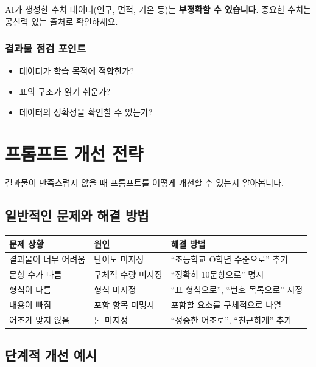 \documentclass[11pt,a4paper]{article}
\begin{document}
\begin{warningbox}
AI가 생성한 수치 데이터(인구, 면적, 기온 등)는 \textbf{부정확할 수 있습니다}. 중요한 수치는 공신력 있는 출처로 확인하세요.
\end{warningbox}

\subsubsection{결과물 점검 포인트}

\begin{itemize}
  \item 데이터가 학습 목적에 적합한가?
  \item 표의 구조가 읽기 쉬운가?
  \item 데이터의 정확성을 확인할 수 있는가?
\end{itemize}

\newpage

\section{프롬프트 개선 전략}

결과물이 만족스럽지 않을 때 프롬프트를 어떻게 개선할 수 있는지 알아봅니다.

\subsection{일반적인 문제와 해결 방법}

\begin{center}
\begin{tabular}{|l|l|l|}
\hline
\rowcolor{lightblue}
\textbf{문제 상황} & \textbf{원인} & \textbf{해결 방법} \\
\hline
결과물이 너무 어려움 & 난이도 미지정 & ``초등학교 O학년 수준으로'' 추가 \\
\hline
문항 수가 다름 & 구체적 수량 미지정 & ``정확히 10문항으로'' 명시 \\
\hline
형식이 다름 & 형식 미지정 & ``표 형식으로'', ``번호 목록으로'' 지정 \\
\hline
내용이 빠짐 & 포함 항목 미명시 & 포함할 요소를 구체적으로 나열 \\
\hline
어조가 맞지 않음 & 톤 미지정 & ``정중한 어조로'', ``친근하게'' 추가 \\
\hline
\end{tabular}
\end{center}

\subsection{단계적 개선 예시}
\end{document}
